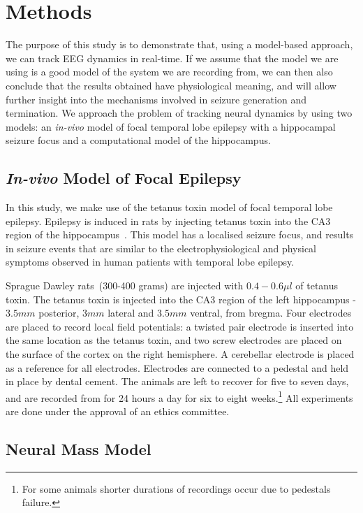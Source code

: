 \section{Methods}

The purpose of this study is to demonstrate that, using a model-based approach, we can track EEG dynamics in real-time. If we assume that the model we are using is a good model of the system we are recording from, we can then also conclude that the results obtained have physiological meaning, and will allow further insight into the mechanisms involved in seizure generation and termination. We approach the problem of tracking neural dynamics by using two models: an \textsl{in-vivo} model of focal temporal lobe epilepsy with a hippocampal seizure focus and a computational model of the hippocampus.

\subsection{\textsl{In-vivo} Model of Focal Epilepsy}

In this study, we make use of the tetanus toxin model of focal temporal lobe epilepsy. Epilepsy is induced in rats by injecting tetanus toxin into the CA3 region of the hippocampus~\citep{jefferys1995chronic}. This model has a localised seizure focus, and results in seizure events that are similar to the electrophysiological and physical symptoms observed in human patients with temporal lobe epilepsy. 

Sprague Dawley rats~(300-400 grams) are injected with $0.4-0.6\mu l$ of tetanus toxin. The tetanus toxin is injected into the CA3 region of the left hippocampus - $3.5mm$ posterior, $3mm$ lateral and $3.5mm$ ventral, from bregma. Four electrodes are placed to record local field potentials: a twisted pair electrode is inserted into the same location as the tetanus toxin, and two screw electrodes are placed on the surface of the cortex on the right hemisphere. A cerebellar electrode is placed as a reference for all electrodes. Electrodes are connected to a pedestal and held in place by dental cement. The animals are left to recover for five to seven days, and are recorded from for 24 hours a day for six to eight weeks.\footnote{For some animals shorter durations of recordings occur due to pedestals failure.} All experiments are done under the approval of an ethics committee.

\subsection{Neural Mass Model} 

